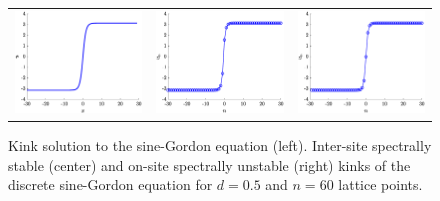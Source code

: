 \documentclass[12pt,reqno]{amsart}
\begin{document}
\begin{figure}
	\begin{center}
	\begin{tabular}{ccc}
	\includegraphics[width=5cm]{contSGkink.eps}	&
	\includegraphics[width=5cm]{1kinkintersite.eps} &
	\includegraphics[width=5cm]{1kinkonsite.eps}
	\end{tabular}
	\end{center}
	\caption{Kink solution to the sine-Gordon equation (left). Inter-site spectrally stable (center) and on-site 
	spectrally unstable (right) kinks of the discrete sine-Gordon equation for $d = 0.5$ and $n=60$ lattice points. }
	\label{fig:SGkinks}
\end{figure}
\end{document}
